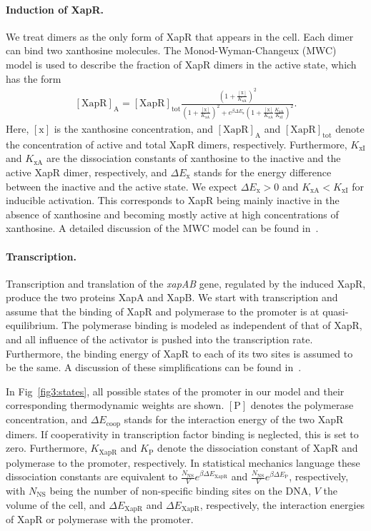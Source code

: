 \documentclass[10pt,letterpaper]{article}
\newcommand{\n}[1]{\mathrm{#1}}
\begin{document}
\paragraph*{Induction of XapR.} 
We treat dimers as the only form of XapR that appears in the cell. Each
dimer can bind two xanthosine molecules. The Monod-Wyman-Changeux (MWC)
model is used to describe the fraction of XapR dimers in the active state,
which has the form
\begin{eqnarray}
\label{eq:MWC}
\n{[XapR]_A} = \n{[XapR]_{tot}} \frac{\left(1 + \frac{\n{[x]}}{K_{\n{xA}}}\right)^2}{\left(1 + \frac{\n{[x]}}{K_{\n{xA}}}\right)^2 + e^{\beta \Delta E_{\n{x}}} \left(1+\frac{\n{[x]}}{K_{\n{xA}}} \frac{K_{\n{xA}}}{K_{\n{xI}}}\right)^2}.
\end{eqnarray}
Here, $\n{[x]}$ is the xanthosine concentration, and $\n{[XapR]_A}$ and
$\n{[XapR]_{tot}}$ denote the concentration of active and total XapR dimers,
respectively. Furthermore, $K_{\n{xI}}$ and $K_{\n{xA}}$ are the
dissociation constants of xanthosine to the inactive and the active XapR
dimer, respectively, and $\Delta E_{\n{x}}$ stands for the energy difference
between the inactive and the active state. We expect $\Delta E_{\n{x}} > 0$
and $K_{\n{xA}} < K_{\n{xI}}$ for inducible activation. This corresponds to
XapR being mainly inactive in the absence of xanthosine and becoming mostly
active at high concentrations of xanthosine. A detailed discussion of the
MWC model can be found in~\cite{Marzen2013}.

\paragraph*{Transcription.}
Transcription and translation of the \emph{xapAB} gene, regulated by the
induced XapR, produce the two proteins XapA and XapB. We start with
transcription and assume that the binding of XapR and polymerase to the
promoter is at quasi-equilibrium. The polymerase binding is modeled as
independent of that of XapR, and all influence of the activator is pushed
into the transcription rate. Furthermore, the binding energy of XapR to each
of its two sites is assumed to be the same. A discussion of these
simplifications can be found in~.

In Fig~\ref{fig3:states}, all possible states of the promoter in our model
and their corresponding thermodynamic weights are shown. $\n{[P]}$
denotes the polymerase concentration, and $\Delta E_{\n{coop}}$ stands for
the interaction energy of the two XapR dimers. If cooperativity in
transcription factor binding is neglected, this is set to zero. Furthermore,
$K_{\n{XapR}}$ and $K_{\n{P}}$ denote the dissociation constant of XapR and
polymerase to the promoter, respectively. In statistical mechanics language
these dissociation constants are equivalent to
$\frac{N_{\n{NS}}}{V} e^{\beta \Delta E_{\n{XapR}}}$
and $\frac{N_{\n{NS}}}{V} e^{\beta \Delta E_{\n{P}}}$, respectively,
with $N_{\mathrm{NS}}$ being the number of non-specific binding sites on the
DNA, $V$ the volume of the cell, and $\Delta E_{\n{XapR}}$ and
$\Delta E_{\n{XapR}}$, respectively, the interaction energies
of XapR or polymerase with the promoter.
\end{document}

